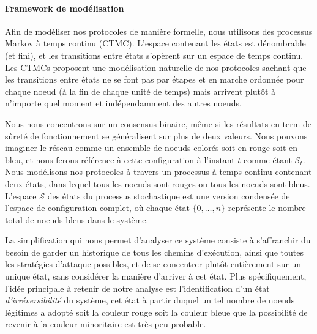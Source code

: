 \documentclass[letterpaper,twocolumn,10pt]{article}
\DeclarePairedDelimiter{\floor}{\lfloor}{\rfloor}
\theoremstyle{definition}
\begin{document}

\paragraph{Framework de modélisation} Afin de modéliser nos protocoles de manière formelle, nous utilisons des
processus Markov à temps continu (CTMC). L'espace contenant les états est dénombrable (et fini), et les transitions
entre états s'opèrent sur un espace de temps continu. Les CTMCs proposent une modélisation naturelle de nos protocoles
sachant que les transitions entre états ne se font pas par étapes et en marche ordonnée pour chaque noeud (à la fin de
chaque unité de temps) mais arrivent plutôt à n'importe quel moment et indépendamment des autres noeuds.

Nous nous concentrons sur un consensus binaire, même si les résultats en term de sûreté de fonctionnement se
généralisent sur plus de deux valeurs. Nous pouvons imaginer le réseau comme un ensemble de noeuds colorés soit en
rouge soit en bleu, et nous ferons référence à cette configuration à l'instant $t$ comme étant $\mathcal{S}_t$.
Nous modélisons nos protocoles à travers un processus à temps continu contenant deux états, dans lequel tous les noeuds
sont rouges ou tous les noeuds sont bleus. L'espace $\mathcal{S}$ des états du processus stochastique est une version
condensée de l'espace de configuration complet, où chaque état $\{0, \dots, n\}$ représente le nombre total de noeuds
bleus dans le système.

La simplification qui nous permet d'analyser ce système consiste à s'affranchir du besoin de garder un historique de
tous les chemins d'exécution, ainsi que toutes les stratégies d'attaque possibles, et de se concentrer plutôt
entièrement sur un unique état, sans considérer la manière d'arriver à cet état. Plus spécifiquement, l'idée principale
à retenir de notre analyse est l'identification d'un état \textit{d'irréversibilité} du système, cet état à partir
duquel un tel nombre de noeuds légitimes a adopté soit la couleur rouge soit la couleur bleue que la possibilité de
revenir à la couleur minoritaire est très peu probable.
\end{document}
